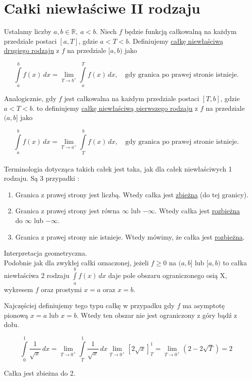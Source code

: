 \section{Całki niewłaściwe II rodzaju}

Ustalamy liczby $ a,b \in \mathbb{R}, \ a < b $. Niech $f$ będzie funkcją całkowalną na każdym przedziale postaci $[a, T] $,
gdzie $ a < T < b $. Definiujemy \underline{całkę niewłaściwą drugiego rodzaju} z $f$ na przedziale $[a, b)$ jako

\[ \int\limits_{a}^{b} f(x) \,dx = \lim_{T \to b^+} \int\limits_{a}^{T} f(x) \,dx, \quad \textrm{gdy granica po prawej stronie istnieje.}\]

Analogicznie, gdy $f$ jest całkowalna na każdym przedziale postaci $[T,b]$, gdzie $ a < T < b $. to definiujemy
\underline{całkę niewłaściwą pierwszego rodzaju} z $f$ na przedziale $(a, b]$ jako

\[ \int\limits_{a}^{b} f(x) \,dx = \lim_{T \to a^+} \int\limits_{T}^{b} f(x) \,dx, \quad \textrm{gdy granica po prawej stronie istnieje.}\]\\

Terminologia dotycząca takich całek jest taka, jak dla całek niewłaściwych 1 rodzaju. Są 3 przypadki : 

\begin{enumerate}
    \item Granica z prawej strony jest liczbą. Wtedy całka jest \underline{zbieżna} (do tej granicy).
    \item Granica z prawej strony jest równa $\infty$ lub $-\infty$. Wtedy całka jest \underline{rozbieżna} do $\infty$ lub $-\infty$.
    \item Granica z prawej strony nie istnieje. Wtedy mówimy, że całka jest \underline{rozbieżna}. \\
\end{enumerate}

Interpretacja geometryczna. \\

Podobnie jak dla zwykłej całki oznaczonej, jeżeli $f \geq 0$ na $(a,b]$ lub $[a,b)$ to całka niewłaściwa 2 rodzaju
$ \int\limits_{a}^{b} f(x) \,dx $ daje pole obszaru ograniczonego osią X, wykresem $f$ oraz prostymi $x=a$ oraz $x=b$.

Najczęściej definiujemy tego typu całkę w przypadku gdy $f$ ma asymptotę pionową $x=a$ lub $x=b$. Wtedy ten obszar
nie jest ograniczony z góry bądź z dołu. \\

\begin{przyklad}

\[ \int\limits_{0}^{1} \frac{1}{\sqrt{x}} \,dx = \lim_{T \to 0^+} \int\limits_{T}^{1} \frac{1}{\sqrt{x}} \,dx
\lim_{T \to 0^+} [2\sqrt{x}]_T^1 = \lim_{T \to 0^+} (2 - 2\sqrt{T}) = 2 \]

Całka jest zbieżna do 2.
\end{przyklad}

